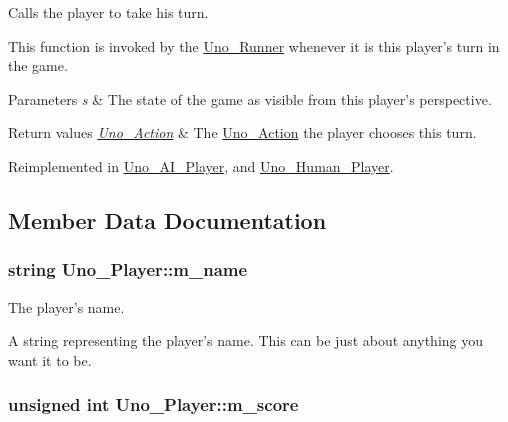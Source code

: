 \-Calls the player to take his turn. 

\-This function is invoked by the \hyperlink{class_uno___runner}{\-Uno\-\_\-\-Runner} whenever it is this player's turn in the game. 
\begin{DoxyParams}{\-Parameters}
{\em s} & \-The state of the game as visible from this player's perspective. \\
\hline
\end{DoxyParams}

\begin{DoxyRetVals}{\-Return values}
{\em \hyperlink{class_uno___action}{\-Uno\-\_\-\-Action}} & \-The \hyperlink{class_uno___action}{\-Uno\-\_\-\-Action} the player chooses this turn. \\
\hline
\end{DoxyRetVals}


\-Reimplemented in \hyperlink{class_uno___a_i___player_a46dd95e2b2ff44fa0b5cc80fb1d66605}{\-Uno\-\_\-\-A\-I\-\_\-\-Player}, and \hyperlink{class_uno___human___player_a14a73bddb4791cc7406a0e9cfe65979b}{\-Uno\-\_\-\-Human\-\_\-\-Player}.



\subsection{\-Member \-Data \-Documentation}
\hypertarget{class_uno___player_a06af109b4d621efa14ba98e4c9395739}{
\subsubsection[{m\-\_\-name}]{\setlength{\rightskip}{0pt plus 5cm}string {\bf \-Uno\-\_\-\-Player\-::m\-\_\-name}}}
\label{class_uno___player_a06af109b4d621efa14ba98e4c9395739}


\-The player's name. 

\-A string representing the player's name. \-This can be just about anything you want it to be. \hypertarget{class_uno___player_a9805f306a500b1898c0a0922d76de444}{
\subsubsection[{m\-\_\-score}]{\setlength{\rightskip}{0pt plus 5cm}unsigned int {\bf \-Uno\-\_\-\-Player\-::m\-\_\-score}}}
\label{class_uno___player_a9805f306a500b1898c0a0922d76de444}


